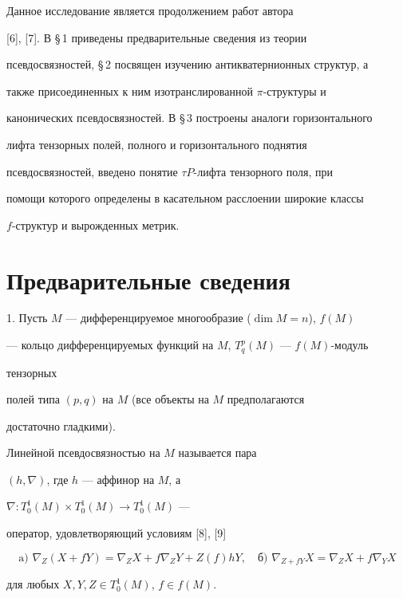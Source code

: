 Данное исследование является продолжением работ автора


[6], [7]. В \S\,1 приведены предварительные сведения из теории


псевдосвязностей, \S\,2 посвящен изучению антикватернионных структур, а


также присоединенных к ним изотранслированной $\pi$-структуры и


канонических псевдосвязностей. В \S\,3 построены аналоги горизонтального


лифта тензорных полей, полного и горизонтального поднятия


псевдосвязностей, введено понятие $\tau P$-лифта тензорного поля, при


помощи которого определены в касательном расслоении широкие классы


$f$-структур и вырожденных метрик.





\section{Предварительные сведения}





1. Пусть $M$ --- дифференцируемое многообразие ($\dim M=n$), $f(M)$


--- кольцо дифференцируемых функций на $M$, $T^p_q(M)$ --- $f(M)$-модуль


тензорных


полей типа $(p,q)$ на $M$ (все объекты на $M$ предполагаются


достаточно гладкими).





\begin{defn} Линейной псевдосвязностью на $M$ называется пара


$(h,\nabla)$, где $h$ --- аффинор на $M$, а


$\nabla:T^1_0(M)\times T^1_0(M)\to T^1_0(M)$ ---


оператор, удовлетворяющий условиям [8], [9]


\begin{equation}


\text{a) }\nabla_Z(X+fY)=\nabla_Z X+f\nabla_Z Y+


Z(f)hY,\quad \text{б) } \nabla_{Z+fY}X=\nabla_Z X+f\nabla_Y X


\end{equation}


для любых $X,Y,Z\in T^1_0(M)$, $f\in f(M)$.


\end{defn}





